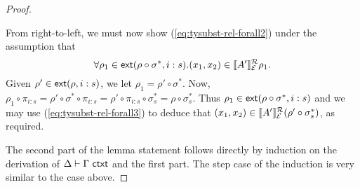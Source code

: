 \begin{proof}
\begin{description}
    From right-to-left, we must now show
    (\ref{eq:tysubst-rel-forall2}) under the assumption that
    \begin{equation}
      \label{eq:tysubst-rel-forall3}
      \forall \rho_1 \in \mathsf{ext}(\rho \circ \sigma^*,i:s). (x_1,x_2) \in \llbracket A' \rrbracket^{\mathcal{R}}_{\mathcal{E}}{\rho_1}.
    \end{equation}
    Given $\rho' \in \mathsf{ext}(\rho,i:s)$, we let $\rho_1 = \rho'
    \circ \sigma^*$. Now, $\rho_1 \circ \pi_{i:s} = \rho' \circ
    \sigma^* \circ \pi_{i:s} = \rho' \circ \pi_{i:s} \circ \sigma_s^{*}
    = \rho \circ \sigma_s^{*}$. Thus $\rho_1 \in \mathsf{ext}(\rho \circ
      \sigma^*,i:s)$ and we may use (\ref{eq:tysubst-rel-forall3}) to
    deduce that $(x_1,x_2) \in \llbracket A' \rrbracket^{\mathcal{R}}_{\mathcal{E}}{(\rho' \circ \sigma_s^{*})}$,
    as required.
  \end{description}
  The second part of the lemma statement follows directly by induction
  on the derivation of $\Delta \vdash \Gamma \textsf{ ctxt}$ and the first
  part. The step case of the induction is very similar to the
   case above.
\end{proof}
